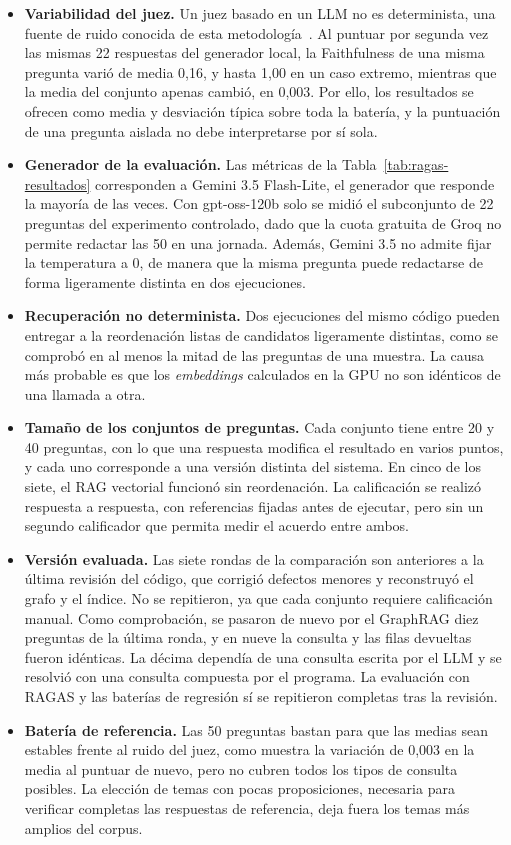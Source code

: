 \documentclass[11pt, a4paper]{report}
\begin{document}
	\begin{itemize}
		\item \textbf{Variabilidad del juez.} Un juez basado en un LLM no es determinista, una fuente de ruido conocida de esta metodología~\cite{gu2024-llm-judge-survey}. Al puntuar por segunda vez las
		mismas 22 respuestas del generador local, la Faithfulness de una misma
		pregunta varió de media 0,16, y hasta 1,00 en un caso extremo, mientras
		que la media del conjunto apenas cambió, en 0,003. Por ello, los
		resultados se ofrecen como media y desviación típica sobre toda la
		batería, y la puntuación de una pregunta aislada no debe interpretarse por
		sí sola.
		\item \textbf{Generador de la evaluación.} Las métricas de la
		Tabla~\ref{tab:ragas-resultados} corresponden a Gemini 3.5 Flash-Lite, el generador que responde la mayoría de las veces. Con gpt-oss-120b
		solo se midió el subconjunto de 22 preguntas del experimento controlado, dado que la cuota gratuita de Groq no permite redactar las 50 en una
		jornada. Además, Gemini 3.5 no admite fijar la temperatura a 0, de manera que la misma pregunta puede redactarse de forma ligeramente distinta en dos
		ejecuciones.
		\item \textbf{Recuperación no determinista.} Dos ejecuciones del mismo
		código pueden entregar a la reordenación listas de candidatos ligeramente
		distintas, como se comprobó en al menos la mitad de las preguntas de una
		muestra. La causa más probable es que los \textit{embeddings} calculados
		en la GPU no son idénticos de una llamada a otra.
		\item \textbf{Tamaño de los conjuntos de preguntas.} Cada conjunto
		tiene entre 20 y 40 preguntas, con lo que una respuesta modifica el
		resultado en varios puntos, y cada uno corresponde a una versión distinta
		del sistema. En cinco de los siete, el RAG vectorial funcionó sin
		reordenación. La calificación se realizó respuesta a respuesta, con
		referencias fijadas antes de ejecutar, pero sin un segundo calificador que
		permita medir el acuerdo entre ambos.
		\item \textbf{Versión evaluada.} Las siete rondas de la comparación son anteriores a la última revisión del código, que corrigió defectos menores
		y reconstruyó el grafo y el índice. No se repitieron, ya que cada conjunto requiere calificación manual. Como comprobación, se pasaron de nuevo por
		el GraphRAG diez preguntas de la última ronda, y en nueve la consulta y
		las filas devueltas fueron idénticas. La décima dependía de una consulta
		escrita por el LLM y se resolvió con una consulta compuesta por el
		programa. La evaluación con RAGAS y las baterías de regresión sí se
		repitieron completas tras la revisión.
		\item \textbf{Batería de referencia.} Las 50 preguntas bastan
		para que las medias sean estables frente al ruido del juez, como muestra la
		variación de 0,003 en la media al puntuar de nuevo, pero no cubren
		todos los tipos de consulta posibles. La elección de temas con pocas
		proposiciones, necesaria para verificar completas las respuestas de
		referencia, deja fuera los temas más amplios del corpus.
	\end{itemize}
\end{document}
